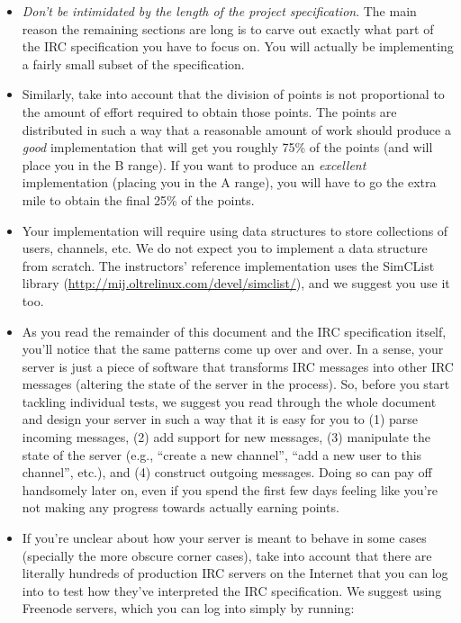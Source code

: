 \documentclass[10pt]{article}
\begin{document}
\begin{itemize}
\item \emph{Don't be intimidated by the length of the project specification}. The main reason the remaining sections are long is to carve out exactly what part of the IRC specification you have to focus on. You will actually be implementing a fairly small subset of the specification.
\item Similarly, take into account that the division of points is not proportional to the amount of effort required to obtain those points. The points are distributed in such a way that a reasonable amount of work should produce a \emph{good} implementation that will get you roughly 75\% of the points (and will place you in the B range). If you want to produce an \emph{excellent} implementation (placing you in the A range), you will have to go the extra mile to obtain the final 25\% of the points.
\item Your implementation will require using data structures to store collections of users, channels, etc. We do not expect you to implement a data structure from scratch. The instructors' reference implementation uses the SimCList library (\url{http://mij.oltrelinux.com/devel/simclist/}), and we suggest you use it too.
\item As you read the remainder of this document and the IRC specification itself, you'll notice that the same patterns come up over and over. In a sense, your server is just a piece of software that transforms IRC messages into other IRC messages (altering the state of the server in the process). So, before you start tackling individual tests, we suggest you read through the whole document and design your server in such a way that it is easy for you to (1) parse incoming messages, (2) add support for new messages, (3) manipulate the state of the server (e.g., ``create a new channel'', ``add a new user to this channel'', etc.), and (4) construct outgoing messages. Doing so can pay off handsomely later on, even if you spend the first few days feeling like you're not making any progress towards actually earning points.
\item If you're unclear about how your server is meant to behave in some cases (specially the more obscure corner cases), take into account that there are literally hundreds of production IRC servers on the Internet that you can log into to test how they've interpreted the IRC specification. We suggest using Freenode servers, which you can log into simply by running:


\end{itemize}
\end{document}
